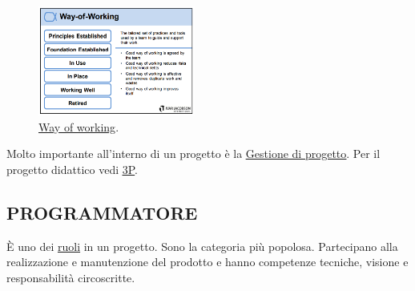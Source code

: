 		\begin{figure}[H]
			\centering
			\includegraphics[width=0.46\textwidth]{img/cards/way}
			\caption{\underline{\hyperref[way]{Way of working}}.}
		\end{figure}

		Molto importante all'interno di un progetto è la \underline{\hyperref[gestioneprogetto]{Gestione di progetto}}. Per il progetto didattico vedi \underline{\hyperref[3p]{3P}}.


		\subsection{PROGRAMMATORE}  \label{programmatore}
		È uno dei \underline{\hyperref[ruoli]{ruoli}} in un progetto. Sono la categoria più popolosa. Partecipano alla realizzazione e manutenzione del prodotto e hanno competenze tecniche, visione e responsabilità circoscritte.


